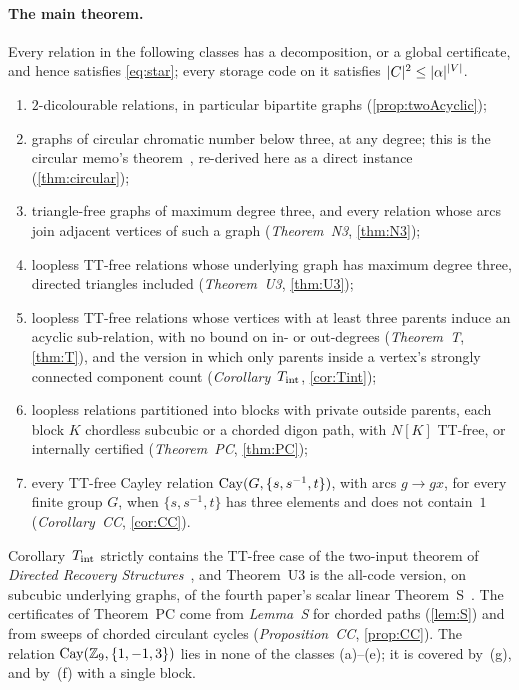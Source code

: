 \paragraph{The main theorem.} Every relation in the following classes has a decomposition, or a global certificate, and
hence satisfies \eqref{eq:star}; every storage code on it satisfies $\lvert C \rvert^2\le\lvert \alpha \rvert^{\lvert V \rvert}$.
\begin{enumerate}[label=(\alph*),leftmargin=2.5em]
\item $2$-dicolourable relations, in particular bipartite graphs (\cref{prop:twoAcyclic});
\item graphs of circular chromatic number below three, at any degree; this is the circular memo's
theorem~\cite[Corollary~3.2]{CircularMemo2026}, re-derived here as a direct instance (\cref{thm:circular});
\item triangle-free graphs of maximum degree three, and every relation whose arcs join adjacent vertices of such a graph
(\emph{Theorem~N3}, \cref{thm:N3});
\item loopless TT-free relations whose underlying graph has maximum degree three, directed triangles included
(\emph{Theorem~U3}, \cref{thm:U3});
\item loopless TT-free relations whose vertices with at least three parents induce an acyclic sub-relation, with no bound
on in- or out-degrees (\emph{Theorem~T}, \cref{thm:T}), and the version in which only parents inside a vertex's strongly
connected component count (\emph{Corollary~$T_{\mathrm{int}}$}, \cref{cor:Tint});
\item loopless relations partitioned into blocks with private outside parents, each block $K$ chordless subcubic or a
chorded digon path, with $N[K]$ TT-free, or internally certified (\emph{Theorem~PC}, \cref{thm:PC});
\item every TT-free Cayley relation $\operatorname{Cay}(G,\{s,s^{-1},t\})$, with arcs $g\to gx$, for every finite group $G$, when
$\{s,s^{-1},t\}$ has three elements and does not contain~$1$ (\emph{Corollary~CC}, \cref{cor:CC}).
\end{enumerate}
Corollary~$T_{\mathrm{int}}$ strictly contains the TT-free case of the two-input theorem of \emph{Directed Recovery
Structures}~\cite[Theorem~5.1]{DirectedRecovery2026}, and Theorem~U3 is the all-code version, on subcubic underlying
graphs, of the fourth paper's scalar linear Theorem~S~\cite[Theorem~6.13]{FourthPaper2026}. The certificates of
Theorem~PC come from \emph{Lemma~S} for chorded paths (\cref{lem:S}) and from sweeps of chorded circulant cycles
(\emph{Proposition~CC}, \cref{prop:CC}). The relation $\operatorname{Cay}(\mathbb{Z}_9,\{1,-1,3\})$ lies in none of the classes (a)--(e); it is covered
by~(g), and by~(f) with a single block.

